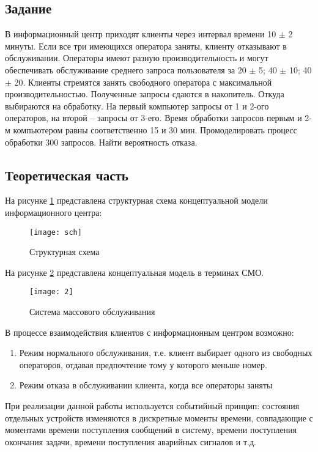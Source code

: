 \documentclass[a4paper,fontsize=12bp]{extreport}
\begin{document}
\subsection*{Задание}

В информационный центр приходят клиенты через интервал времени 10 $\pm$ 2 минуты. Если все три имеющихся оператора заняты, клиенту отказывают в обслуживании. Операторы имеют разную производительность и могут обеспечивать обслуживание среднего запроса пользователя за 20 $\pm$ 5; 40 $\pm$ 10; 40 $\pm$ 20. Клиенты стремятся занять свободного оператора с максимальной производительностью. Полученные запросы сдаются в накопитель. Откуда выбираются на обработку. На первый компьютер запросы от 1 и 2-ого операторов, на второй -- запросы от 3-его. Время обработки запросов первым и 2-м компьютером равны соответственно 15 и 30 мин. Промоделировать процесс обработки 300 запросов. Найти вероятность отказа. 
	
\subsection*{Теоретическая часть}
	
На рисунке \ref{fig:1} представлена структурная схема концептуальной модели информационного центра:

\begin{figure}[H]
    \texttt{[image: sch]}
    \caption{Структурная схема}
    \label{fig:1}
\end{figure}

На рисунке \ref{fig:2} представлена концептуальная модель в терминах СМО.
\begin{figure}[H]
    \texttt{[image: 2]}
    \caption{Система массового обслуживания}
    \label{fig:2}
\end{figure}

В процессе взаимодействия клиентов с информационным центром возможно:
 \begin{enumerate}
\item Режим нормального обслуживания, т.е. клиент выбирает одного из свободных операторов, отдавая предпочтение тому у которого меньше номер.
\item Режим отказа в обслуживании клиента, когда все операторы заняты
 \end{enumerate}

При реализации данной работы используется событийный принцип: состояния отдельных устройств изменяются в дискретные моменты времени, совпадающие с моментами времени поступления сообщений в систему, времени поступления окончания задачи, времени поступления аварийных сигналов и т.д.\\
 
\end{document}
